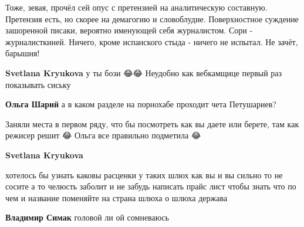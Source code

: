 \begin{itemize}
\begin{itemize}
Тоже, зевая, прочёл сей опус с претензией на аналитическую составную. Претензия
есть, но скорее на демагогию и словоблудие. Поверхностное суждение зашоренной
писаки, вероятно именующей себя журналистом. Сори - журналисткиней. Ничего,
кроме испанского стыда - ничего не испытал. Не зачёт, барышня!

 
\textbf{Svetlana Kryukova} у ты бози 😂😂 Неудобно как вебкамщице первый раз показывать сиську

 
\textbf{Ольга Шарий} а в каком разделе на порнохабе проходит чета Петушариев?

 
Заняли места в первом ряду, что бы посмотреть как вы даете или берете, там как режисер решит 😂 Ольга все правильно подметила 😂

 
\textbf{Svetlana Kryukova} 

хотелось бы узнать каковы расценки у таких шлюх как вы и вы сильно то не сосите
а то челюсть заболит и не забудь написать прайс лист чтобы знать что по чем и
название поменяйте на страна шлюха о шлюха держава

 
\textbf{Владимир Симак} головой ли ой сомневаюсь

 

\end{itemize}
\end{itemize}
